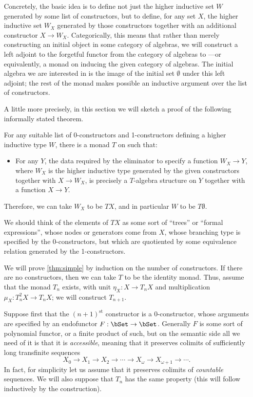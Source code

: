 \documentclass{amsart}
\begin{document}
Concretely, the basic idea is to define not just the higher inductive set $W$ generated by some list of constructors, but to define, for any set $X$, the higher inductive set $W_X$ generated by those constructors together with an additional constructor $X \to W_X$.
Categorically, this means that rather than merely constructing an initial object in some category of algebras, we will construct a left adjoint to the forgetful functor from the category of algebras to \bSet---or equivalently, a monad on \bSet inducing the given category of algebras.
The initial algebra we are interested in is the image of the initial set $\emptyset$ under this left adjoint; the rest of the monad makes possible an inductive argument over the list of constructors.

A little more precisely,
in this section we will sketch a proof of the following informally stated theorem.

\begin{thm}\label{thm:simple}
  For any suitable list of 0-constructors and 1-constructors defining a higher inductive type $W$, there is a monad $T$ on \bSet such that:
  \begin{itemize}
  \item For any $Y$, the data required by the eliminator to specify a function $W_X \to Y$, where $W_X$ is the higher inductive type generated by the given constructors together with $X\to W_X$, is precisely a $T$-algebra structure on $Y$ together with a function $X\to Y$.
  \end{itemize}
  Therefore, we can take $W_X$ to be $T X$, and in particular $W$ to be $T\emptyset$.
\end{thm}

We should think of the elements of $TX$ as some sort of ``trees'' or ``formal expressions'', whose nodes or generators come from $X$, whose branching type is specified by the 0-constructors, but which are quotiented by some equivalence relation generated by the 1-constructors.

We will prove \autoref{thm:simple} by induction on the number of constructors.
If there are no constructors, then we can take $T$ to be the identity monad.
Thus, assume that the monad $T_n$ exists, with unit $\eta_X:X\to T_n X$ and multiplication $\mu_X:T_n^2 X \to T_n X$; we will construct $T_{n+1}$.

Suppose first that the $(n+1)^{\mathrm{st}}$ constructor is a 0-constructor, whose arguments are specified by an endofunctor $F:\bSet\to\bSet$.
Generally $F$ is some sort of polynomial functor, or a finite product of such, but on the semantic side all we need of it is that it is \emph{accessible}, meaning that it preserves colimits of sufficiently long transfinite sequences
\[ X_0 \to X_1 \to X_2 \to \cdots \to X_\omega \to X_{\omega+1} \to \cdots. \]
In fact, for simplicity let us assume that it preserves colimits of \emph{countable} sequences.
We will also suppose that $T_n$ has the same property (this will follow inductively by the construction).
\end{document}
